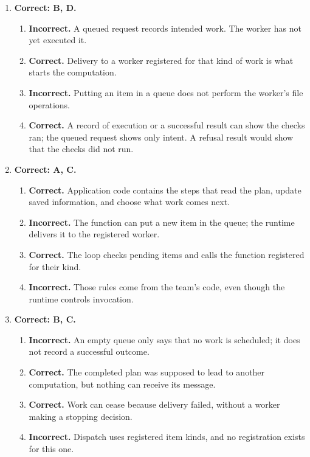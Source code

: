 \begin{enumerate}[start=41,itemsep=0.7\baselineskip]
\item[{\hyperref[exercise:41]{41.}}] \begin{minipage}[t]{\linewidth}
\textbf{Correct: B, D.}
\begin{enumerate}[label=\textnormal{(\Alph*)},leftmargin=*,itemsep=0pt]
\item \textbf{Incorrect.} A queued request records intended work. The worker has not yet executed it.
\item \textbf{Correct.} Delivery to a worker registered for that kind of work is what starts the computation.
\item \textbf{Incorrect.} Putting an item in a queue does not perform the worker's file operations.
\item \textbf{Correct.} A record of execution or a successful result can show the checks ran; the queued request shows only intent. A refusal result would show that the checks did not run.
\end{enumerate}
\end{minipage}

\item[{\hyperref[exercise:42]{42.}}] \begin{minipage}[t]{\linewidth}
\textbf{Correct: A, C.}
\begin{enumerate}[label=\textnormal{(\Alph*)},leftmargin=*,itemsep=0pt]
\item \textbf{Correct.} Application code contains the steps that read the plan, update saved information, and choose what work comes next.
\item \textbf{Incorrect.} The function can put a new item in the queue; the runtime delivers it to the registered worker.
\item \textbf{Correct.} The loop checks pending items and calls the function registered for their kind.
\item \textbf{Incorrect.} Those rules come from the team's code, even though the runtime controls invocation.
\end{enumerate}
\end{minipage}

\item[{\hyperref[exercise:43]{43.}}] \begin{minipage}[t]{\linewidth}
\textbf{Correct: B, C.}
\begin{enumerate}[label=\textnormal{(\Alph*)},leftmargin=*,itemsep=0pt]
\item \textbf{Incorrect.} An empty queue only says that no work is scheduled; it does not record a successful outcome.
\item \textbf{Correct.} The completed plan was supposed to lead to another computation, but nothing can receive its message.
\item \textbf{Correct.} Work can cease because delivery failed, without a worker making a stopping decision.
\item \textbf{Incorrect.} Dispatch uses registered item kinds, and no registration exists for this one.
\end{enumerate}
\end{minipage}


\end{enumerate}
